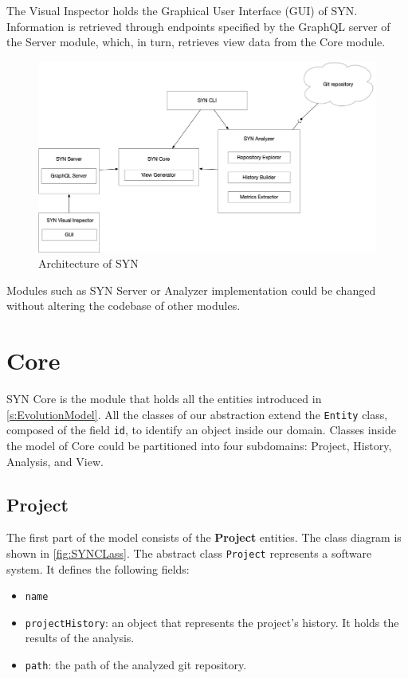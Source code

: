 The Visual Inspector holds the Graphical User Interface (GUI) of SYN. Information is retrieved through endpoints specified by the GraphQL server of the Server module, which, in turn, retrieves view data from the Core module. 


\begin{figure}
    \center
    \includegraphics[width=\textwidth]{SYNArchitecture.jpg}
    \caption{Architecture of SYN}
    \label{fig:architecture}
\end{figure}

Modules such as SYN Server or Analyzer implementation could be changed without altering the codebase of other modules. 

\section{Core}
SYN Core is the module that holds all the entities introduced in \autoref{s:EvolutionModel}. 
All the classes of our abstraction extend the \texttt{Entity} class, composed of the field \texttt{id}, to identify an object inside our domain. 
Classes inside the model of Core could be partitioned into four subdomains: Project, History, Analysis, and View. 

\subsection*{Project}
The first part of the model consists of the \textbf{Project} entities. 
The class diagram is shown in \autoref{fig:SYNCLass}. The abstract class \texttt{Project} represents a software system. It defines the following fields:
\begin{itemize}
    \item \texttt{name}
    \item \texttt{projectHistory}: an object that represents the project's history. It holds the results of the analysis. 
    \item \texttt{path}: the path of the analyzed git repository. 
\end{itemize}

